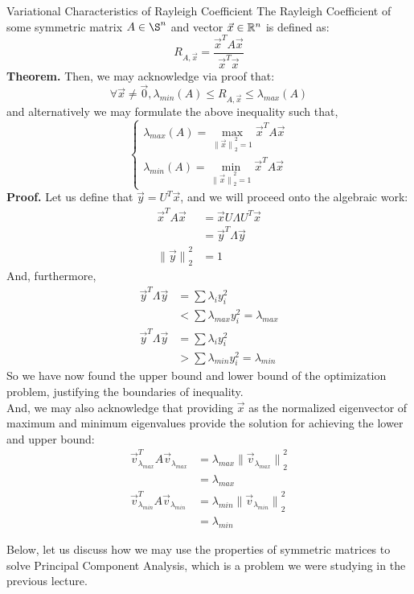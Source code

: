 \begin{ln-theorem}{Variational Characteristics of Rayleigh Coefficient}{}
    The Rayleigh Coefficient of some symmetric matrix $A \in \S^n$ and vector $\vec{x} \in \mathbb{R}^n$ is defined as:
    \[
        R_{A, \vec{x}} = \frac{\vec{x}^T A \vec{x}}{\vec{x}^T \vec{x}}
    \]
    \textbf{Theorem.}
    Then, we may acknowledge via proof that:
    \[
        \forall \vec{x} \neq \vec{0}, \lambda_{min}(A) \leq R_{A, \vec{x}} \leq \lambda_{max}(A)
    \]
    and alternatively we may formulate the above inequality such that,
    \[
        \begin{cases}
            \lambda_{max}(A) = \max_{{\lVert \vec{x} \rVert}_2^2 = 1}\vec{x}^T A \vec{x} \\
            \lambda_{min}(A) = \min_{{\lVert \vec{x} \rVert}_2^2 = 1}\vec{x}^T A \vec{x}
        \end{cases}
    \]
    \tcblower
    \textbf{Proof.}
    Let us define that $\vec{y} = U^T \vec{x}$, and we will proceed onto the algebraic work:
    \begin{align*}
        \vec{x}^T A \vec{x}
        &= \vec{x} U \Lambda U^T \vec{x} \\
        &= \vec{y}^T \Lambda \vec{y} \\
        {\lVert \vec{y} \rVert}_2^2 &= 1
    \end{align*}
    And, furthermore,
    \begin{align*}
        \vec{y}^T \Lambda \vec{y}
        &= \sum \lambda_i y_i^2 \\
        &< \sum \lambda_{max} y_i^2 = \lambda_{max} \\
        \vec{y}^T \Lambda \vec{y}
        &= \sum \lambda_i y_i^2 \\
        &> \sum \lambda_{min} y_i^2 = \lambda_{min}
    \end{align*}
    So we have now found the upper bound and lower bound of the optimization problem, justifying the boundaries of inequality. \\
    And, we may also acknowledge that providing $\vec{x}$ as the normalized eigenvector of maximum and minimum eigenvalues provide the solution for achieving the lower and upper bound:
    \begin{align*}
        \vec{v}_{\lambda_{max}}^T A \vec{v}_{\lambda_{max}}
        &= \lambda_{max} {\lVert \vec{v}_{\lambda_{max}} \rVert}_2^2 \\
        &= \lambda_{max} \\
        \vec{v}_{\lambda_{min}}^T A \vec{v}_{\lambda_{min}}
        &= \lambda_{min} {\lVert \vec{v}_{\lambda_{min}} \rVert}_2^2 \\
        &= \lambda_{min}
    \end{align*}
\end{ln-theorem}
Below, let us discuss how we may use the properties of symmetric matrices to solve Principal Component Analysis, which is a problem we were studying in the previous lecture.

